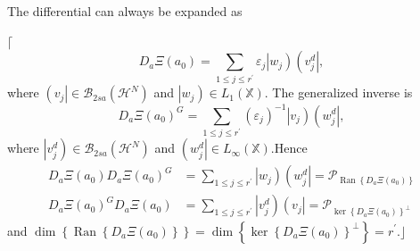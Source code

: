 \documentclass[aps,preprint]{revtex4}%
\begin{document}
The differential can always be expanded as

$\lceil$%
\begin{equation}
D_{a}\Xi\left(  a_{0}\right)  =\sum\limits_{1\leq j\leq r^{\prime}}%
\varepsilon_{j}\left\vert w_{j}\right)  \left(  v_{j}^{d}\right\vert ,
\end{equation}
where $\left(  v_{j}\right\vert \in\mathcal{B}_{2sa}\left(  \mathcal{H}%
^{N}\right)  $ and $\left\vert w_{j}\right)  \in L_{1}\left(  \mathbb{X}%
\right)  .$ The generalized inverse is
\begin{equation}
D_{a}\Xi\left(  a_{0}\right)  ^{G}=\sum\limits_{1\leq j\leq r^{\prime}}\left(
\varepsilon_{j}\right)  ^{-1}\left\vert v_{j}\right)  \left(  w_{j}%
^{d}\right\vert ,
\end{equation}
where $\left\vert v_{j}^{d}\right)  \in\mathcal{B}_{2sa}\left(  \mathcal{H}%
^{N}\right)  $ and $\left(  w_{j}^{d}\right\vert \in L_{\infty}\left(
\mathbb{X}\right)  .$Hence
\begin{align}
D_{a}\Xi\left(  a_{0}\right)  D_{a}\Xi\left(  a_{0}\right)  ^{G}  &
=\sum\limits_{1\leq j\leq r^{\prime}}\left\vert w_{j}\right)  \left(
w_{j}^{d}\right\vert =\mathcal{P}_{\operatorname{Ran}\left\{  D_{a}\Xi\left(
a_{0}\right)  \right\}  }\\
D_{a}\Xi\left(  a_{0}\right)  ^{G}D_{a}\Xi\left(  a_{0}\right)   &
=\sum\limits_{1\leq j\leq r^{\prime}}\left\vert v_{j}^{d}\right)  \left(
v_{j}\right\vert =\mathcal{P}_{\ker\left\{  D_{a}\Xi\left(  a_{0}\right)
\right\}  ^{\bot}}%
\end{align}
and $\dim\left\{  \operatorname{Ran}\left\{  D_{a}\Xi\left(  a_{0}\right)
\right\}  \right\}  =\dim\left\{  \ker\left\{  D_{a}\Xi\left(  a_{0}\right)
\right\}  ^{\bot}\right\}  =r^{\prime}.\rfloor$
\end{document}
